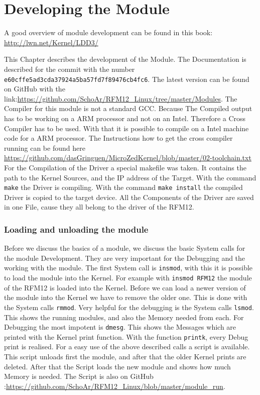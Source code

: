 \chapter{Developing the Module}

A good overview of module development can be found in this book: \url{http://lwn.net/Kernel/LDD3/}\newline

This Chapter describes the development of the Module. The Documentation is described for the commit with the number \verb|e60cffe5ad3cda37924a5ba57fd7f89476cb4fc6|. The latest version can be found on GitHub with the link:\url{https://github.com/SchoAr/RFM12_Linux/tree/master/Modules}.\newline
The Compiler for this module is not a standard GCC. Because The Compiled output has to be working on a ARM processor and not on an Intel. Therefore a Cross Compiler has to be used. With that it is possible to compile on a Intel machine code for a ARM processor. The Instructions how to get the cross compiler running can be found here \url{https://github.com/dasGringuen/MicroZedKernel/blob/master/02-toolchain.txt}
For the Compilation of the Driver a special makefile was taken. It contains the path to the Kernel Sources, and the IP address of the Target. With the command \verb|make| the Driver is compiling. With the command \verb|make install| the compiled Driver is copied to the target device. \newline
All the Components of the Driver are saved in one File, cause they all belong to the driver of the RFM12. 

\subsection{Loading and unloading the module}

Before we discuss the basics of a module, we discuss the basic System calls for the module Development. They are very important for the Debugging and the working with the module. 
The first System call is \verb|insmod|, with this it is possible to load the module into the Kernel. For example with \verb|insmod RFM12| the module of the RFM12 is loaded into the Kernel. Before we can load a newer version of the module into the Kernel we have to remove the older one. This is done with the System calls \verb|rmmod|. Very helpful for the debugging is the System calls \verb|lsmod|. This shows the running modules, and also the Memory needed from each. For Debugging the most impotent is \verb|dmesg|. This shows the Messages which are printed with the Kernel print function. With the function \verb|printk|, every Debug print is realised. \newline
For a easy use of the above described calls a script is available. This script unloads first the module, and after that the older Kernel prints are deleted. After that the Script loads the new module and shows how much Memory is needed. The Script is also on GitHub :\url{https://github.com/SchoAr/RFM12_Linux/blob/master/module_run}.\newline

